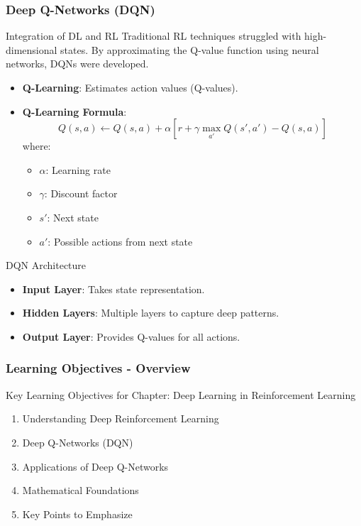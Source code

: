 \documentclass[aspectratio=169]{beamer}
\begin{document}
\begin{frame}[fragile]
    \frametitle{Deep Q-Networks (DQN)}
    
    \begin{block}{Integration of DL and RL}
        Traditional RL techniques struggled with high-dimensional states. By approximating the Q-value function using neural networks, DQNs were developed.
    \end{block}
    
    \begin{itemize}
        \item \textbf{Q-Learning}: Estimates action values (Q-values).
        \item \textbf{Q-Learning Formula}:
        \begin{equation}
            Q(s, a) \gets Q(s, a) + \alpha \left[ r + \gamma \max_{a'} Q(s', a') - Q(s, a) \right]
        \end{equation}
        where:
        \begin{itemize}
            \item \( \alpha \): Learning rate
            \item \( \gamma \): Discount factor
            \item \( s' \): Next state
            \item \( a' \): Possible actions from next state
        \end{itemize}
    \end{itemize}

    \begin{block}{DQN Architecture}
        \begin{itemize}
            \item \textbf{Input Layer}: Takes state representation.
            \item \textbf{Hidden Layers}: Multiple layers to capture deep patterns.
            \item \textbf{Output Layer}: Provides Q-values for all actions.
        \end{itemize}
    \end{block}
\end{frame}

\begin{frame}[fragile]
    \frametitle{Learning Objectives - Overview}
    \begin{block}{Key Learning Objectives for Chapter: Deep Learning in Reinforcement Learning}
        \begin{enumerate}
            \item Understanding Deep Reinforcement Learning
            \item Deep Q-Networks (DQN)
            \item Applications of Deep Q-Networks
            \item Mathematical Foundations
            \item Key Points to Emphasize
        \end{enumerate}
    \end{block}
\end{frame}
\end{document}
